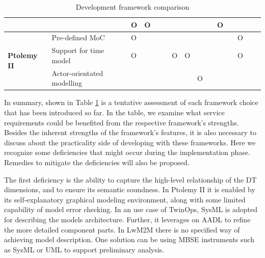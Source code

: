 \documentclass[journal,onecolumn]{IEEEtran} %
\begin{document}
\begin{table}[]
\begin{tabular}{|l|l|llll|lll|lll|lll|}
  \multicolumn{1}{l|}{} &
   &
  \multicolumn{1}{l|}{O} &
  \multicolumn{1}{l|}{O} &
   &
  \multicolumn{1}{l|}{} &
  \multicolumn{1}{l|}{} &
   &
  \multicolumn{1}{l|}{} &
  \multicolumn{1}{l|}{} &
  O \\ \hline
\multirow{3}{*}{\textbf{Ptolemy II}} &
  Pre-defined MoC &
  \multicolumn{1}{l|}{O} &
  \multicolumn{1}{l|}{} &
  \multicolumn{1}{l|}{} &
   &
  \multicolumn{1}{l|}{} &
  \multicolumn{1}{l|}{} &
   &
  \multicolumn{1}{l|}{} &
  \multicolumn{1}{l|}{} &
   &
  \multicolumn{1}{l|}{O} &
  \multicolumn{1}{l|}{} &
   \\ \cline{2-15} 
 &
  Support for time model &
  \multicolumn{1}{l|}{O} &
  \multicolumn{1}{l|}{} &
  \multicolumn{1}{l|}{} &
   &
  \multicolumn{1}{l|}{O} &
  \multicolumn{1}{l|}{O} &
   &
  \multicolumn{1}{l|}{} &
  \multicolumn{1}{l|}{} &
   &
  \multicolumn{1}{l|}{O} &
  \multicolumn{1}{l|}{} &
   \\ \cline{2-15} 
 &
  Actor-orientated modelling &
  \multicolumn{1}{l|}{} &
  \multicolumn{1}{l|}{} &
  \multicolumn{1}{l|}{} &
   &
  \multicolumn{1}{l|}{} &
  \multicolumn{1}{l|}{} &
  O &
  \multicolumn{1}{l|}{} &
  \multicolumn{1}{l|}{} &
   &
  \multicolumn{1}{l|}{} &
  \multicolumn{1}{l|}{} &
   \\ \hline
\end{tabular}
\caption{Development framework comparison}
\label{tab:dfcomp}
\end{table}

In summary, shown in Table \ref{tab:dfcomp} is a tentative assessment of each framework choice that has been introduced so far. In the table, we examine what service requirements could be benefited from the respective framework's strengths. Besides the inherent strengths of the framework's features, it is also necessary to discuss about the practicality side of developing with these frameworks. Here we recognize some deficiencies that might occur during the implementation phase. Remedies to mitigate the deficiencies will also be proposed.

The first deficiency is the ability to capture the high-level relationship of the DT dimensions, and to ensure its semantic soundness. In Ptolemy II it is enabled by its self-explanatory graphical modeling environment, along with some limited capability of model error checking. In an use case of TwinOps, SysML is adopted for describing the models architecture. Further, it leverages on AADL to refine the more detailed component parts. In LwM2M there is no specified way of achieving model description. One solution can be using MBSE instruments such as SysML or UML to support preliminary analysis.
\end{document}
